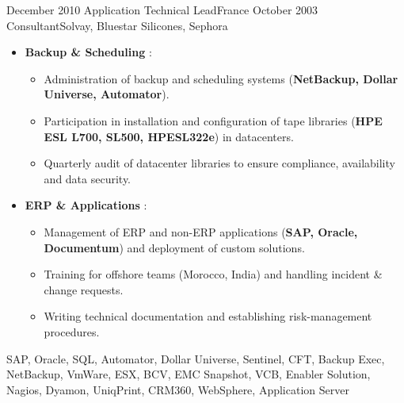 \begin{experiences}
\emptySeparator

\consultantexperience
    {December 2010} {Application Technical Lead}{}{France}
    {October 2003} {Consultant}{Solvay, Bluestar Silicones, Sephora} {
        \begin{itemize}[left=0pt,label={},itemsep=0.5em]
        \vspace{0.3em}

          \item \textbf{Backup \& Scheduling} :
            \begin{itemize}[itemsep=0.2em,topsep=0.2em,parsep=0pt]
              \small
              \item Administration of backup and scheduling systems (\textbf{NetBackup, Dollar Universe, Automator}).
              \item Participation in installation and configuration of tape libraries (\textbf{HPE ESL L700, SL500, HPESL322e}) in datacenters.
              \item Quarterly audit of datacenter libraries to ensure compliance, availability and data security.
            \end{itemize}

        \vspace{0.3em}

          \item \textbf{ERP \& Applications} :
            \begin{itemize}[itemsep=0.2em,topsep=0.2em,parsep=0pt]
              \small
              \item Management of ERP and non-ERP applications (\textbf{SAP, Oracle, Documentum}) and deployment of custom solutions.
              \item Training for offshore teams (Morocco, India) and handling incident \& change requests.
              \item Writing technical documentation and establishing risk-management procedures.
            \end{itemize}

        \end{itemize}
        \vspace{0.3em}
    }
    {SAP, Oracle, SQL, Automator, Dollar Universe, Sentinel, CFT, Backup Exec, NetBackup, VmWare, ESX, BCV, EMC Snapshot, VCB, Enabler Solution, Nagios, Dyamon, UniqPrint, CRM360, WebSphere, Application Server}

\emptySeparator
\end{experiences}